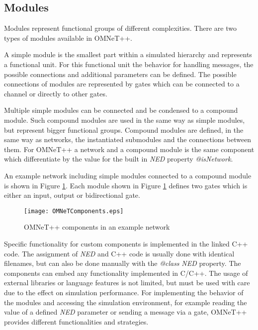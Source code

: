 \subsection{Modules}
\label{sec:omnet_components_modules}
Modules represent functional groups of different complexities.
There are two types of modules available in OMNeT++.

A simple module is the smallest part within a simulated hierarchy and represents a functional unit.
For this functional unit the behavior for handling messages, the possible connections and additional parameters can be defined. \cite[section 3.3]{omnet_manual}
The possible connections of modules are represented by gates which can be connected to a channel or directly to other gates.

Multiple simple modules can be connected and be condensed to a compound module.
Such compound modules are used in the same way as simple modules, but represent bigger functional groups.
Compound modules are defined, in the same way as networks, the instantiated submodules and the connections between them. \cite[section 3.4]{omnet_manual}
For OMNeT++ a network and a compound module is the same component which differentiate by the value for the built in \emph{NED} property \emph{@isNetwork}.

An example network including simple modules connected to a compound module is shown in Figure \ref{fig:OMNeTComponents}.
Each module shown in Figure \ref{fig:OMNeTComponents} defines two gates which is either an input, output or bidirectional gate.

\begin{figure}
    \centering
    \texttt{[image: OMNeTComponents.eps]}
    \caption{OMNeT++ components in an example network}
    \label{fig:OMNeTComponents}
\end{figure}

Specific functionality for custom components is implemented in the linked C++ code.
The assignment of \emph{NED} and C++ code is usually done with identical filenames, but can also be done manually with the \emph{@class} \emph{NED} property.
The components can embed any functionality implemented in C/C++.
The usage of external libraries or language features is not limited, but must be used with care due to the effect on simulation performance.
For implementing the behavior of the modules and accessing the simulation environment, for example reading the value of a defined \emph{NED} parameter or sending a message via a gate, 
OMNeT++ provides different functionalities and strategies.

